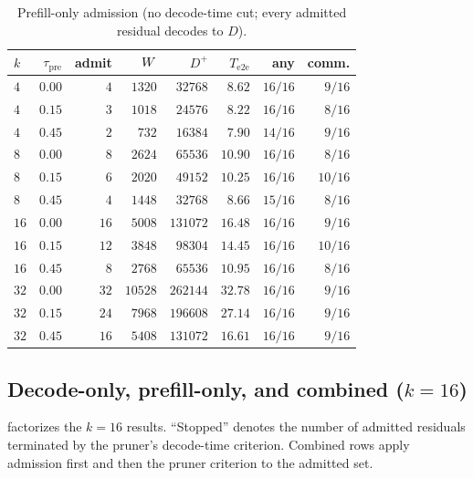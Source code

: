 \begin{table}[t]
\centering
\caption{Prefill-only admission (no decode-time cut; every admitted residual decodes to $D$).}
\label{tab:ablate-prefill}
\scriptsize
\setlength{\tabcolsep}{2.6pt}
\begin{tabular}{@{}lrrrrrrr@{}}
\toprule
$k$ & $\tau_{\mathrm{pre}}$ & admit & $W$ & $D^{+}$ & $T_{\mathrm{e2e}}$ & any & comm. \\
\midrule
$4$ & $0.00$ & $4$ & $1320$ & $32768$ & $8.62$ & $16/16$ & $9/16$ \\
\rowcolor{tblalt}
$4$ & $0.15$ & $3$ & $1018$ & $24576$ & $8.22$ & $16/16$ & $8/16$ \\
$4$ & $0.45$ & $2$ & $732$ & $16384$ & $7.90$ & $14/16$ & $9/16$ \\
\midrule
$8$ & $0.00$ & $8$ & $2624$ & $65536$ & $10.90$ & $16/16$ & $8/16$ \\
\rowcolor{tblalt}
$8$ & $0.15$ & $6$ & $2020$ & $49152$ & $10.25$ & $16/16$ & $10/16$ \\
$8$ & $0.45$ & $4$ & $1448$ & $32768$ & $8.66$ & $15/16$ & $8/16$ \\
\midrule
$16$ & $0.00$ & $16$ & $5008$ & $131072$ & $16.48$ & $16/16$ & $9/16$ \\
\rowcolor{tblalt}
$16$ & $0.15$ & $12$ & $3848$ & $98304$ & $14.45$ & $16/16$ & $10/16$ \\
$16$ & $0.45$ & $8$ & $2768$ & $65536$ & $10.95$ & $16/16$ & $8/16$ \\
\midrule
$32$ & $0.00$ & $32$ & $10528$ & $262144$ & $32.78$ & $16/16$ & $9/16$ \\
\rowcolor{tblalt}
$32$ & $0.15$ & $24$ & $7968$ & $196608$ & $27.14$ & $16/16$ & $9/16$ \\
$32$ & $0.45$ & $16$ & $5408$ & $131072$ & $16.61$ & $16/16$ & $9/16$ \\
\bottomrule
\end{tabular}
\end{table}

\subsection{Decode-only, prefill-only, and combined ($k{=}16$)}
\label{sec:ablate-combine}

 factorizes the $k{=}16$ results.
``Stopped'' denotes the number of admitted residuals terminated by the pruner's decode-time criterion.
Combined rows apply admission first and then the pruner criterion to the admitted set.

